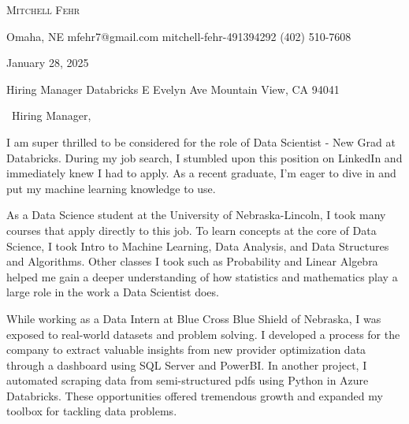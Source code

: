 \documentclass[11pt]{letter}
\begin{document}
\AddToShipoutPictureBG{%
\color{gr}
\AtPageUpperLeft{\rule[-1.3in]{\paperwidth}{1.3in}}
}

\begin{center}
{\fontsize{28}{0}\selectfont\scshape Mitchell Fehr}

\faMapMarker\enspace Omaha, NE \hfill
\faEnvelope\enspace mfehr7@gmail.com\hfill
\faLinkedinIn\enspace mitchell-fehr-491394292\hfill
\faPhone\enspace (402) 510-7608
\end{center}

\vspace{0.3in}

January 28, 2025

\vspace{0.2in}
Hiring Manager \newline
Databricks  E Evelyn Ave \newline
Mountain View, CA 94041 \newline

\vspace{-0.1in}\greeting\ Hiring Manager, \newline

\vspace{-0.1in}\setlength\parindent{24pt}


\noindent I am super thrilled to be considered for the role of Data Scientist - New Grad at Databricks. During my job search, I stumbled upon this position on LinkedIn and immediately knew I had to apply. As a recent graduate, I'm eager to dive in and put my machine learning knowledge to use.

\noindent As a Data Science student at the University of Nebraska-Lincoln, I took many courses that apply directly to this job. To learn concepts at the core of Data Science, I took Intro to Machine Learning, Data Analysis, and Data Structures and Algorithms. Other classes I took such as Probability and Linear Algebra helped me gain a deeper understanding of how statistics and mathematics play a large role in the work a Data Scientist does. 

\noindent While working as a Data Intern at Blue Cross Blue Shield of Nebraska, I was exposed to real-world datasets and problem solving. I developed a process for the company to extract valuable insights from new provider optimization data through a dashboard using SQL Server and PowerBI. In another project, I automated scraping data from semi-structured pdfs using Python in Azure Databricks. These opportunities offered tremendous growth and expanded my toolbox for tackling data problems. 
\end{document}
